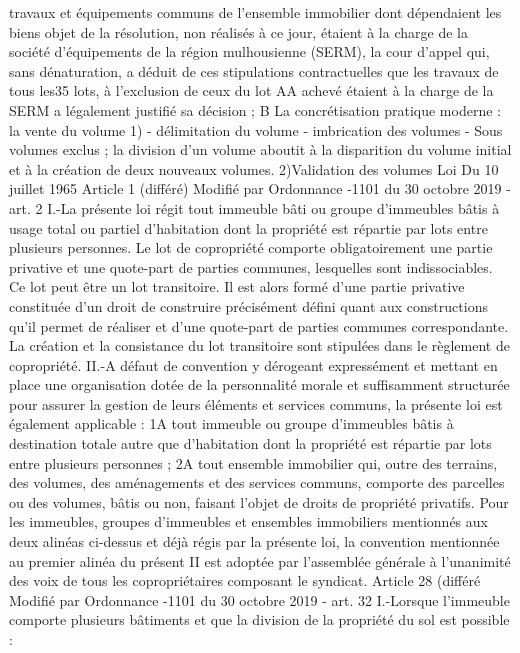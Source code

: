 \documentclass[11pt,a4paper]{report}
\begin{document}
	travaux et équipements communs de l'ensemble immobilier dont dépendaient les biens
	objet de la résolution, non réalisés à ce jour, étaient à la charge de la société
	d'équipements de la région mulhousienne (SERM), la cour d'appel qui, sans
	dénaturation, a déduit de ces stipulations contractuelles que les travaux de tous les35
	lots, à l'exclusion de ceux du lot AA achevé étaient à la charge de la SERM a
	légalement justifié sa décision ;
	B La concrétisation pratique moderne : la vente du volume
	1) - délimitation du volume
	- imbrication des volumes
	- Sous volumes exclus ; la division d’un volume aboutit à la disparition du volume initial et à la création de deux
	nouveaux volumes.
	2)Validation des volumes
	Loi Du 10 juillet 1965 Article 1 (différé) Modifié par Ordonnance -1101 du 30 octobre 2019 - art. 2
	I.-La présente loi régit tout immeuble bâti ou groupe d'immeubles bâtis à usage total ou partiel d'habitation dont
	la propriété est répartie par lots entre plusieurs personnes.
	Le lot de copropriété comporte obligatoirement une partie privative et une quote-part de parties communes,
	lesquelles sont indissociables.
	Ce lot peut être un lot transitoire. Il est alors formé d'une partie privative constituée d'un droit de construire
	précisément défini quant aux constructions qu'il permet de réaliser et d'une quote-part de parties communes
	correspondante.
	La création et la consistance du lot transitoire sont stipulées dans le règlement de copropriété.
	II.-A défaut de convention y dérogeant expressément et mettant en place une organisation dotée de la
	personnalité morale et suffisamment structurée pour assurer la gestion de leurs éléments et services communs,
	la présente loi est également applicable :
	1\degre  A tout immeuble ou groupe d'immeubles bâtis à destination totale autre que d'habitation dont la propriété est
	répartie par lots entre plusieurs personnes ;
	2\degre  A tout ensemble immobilier qui, outre des terrains, des volumes, des aménagements et des services communs,
	comporte des parcelles ou des volumes, bâtis ou non, faisant l'objet de droits de propriété privatifs.
	Pour les immeubles, groupes d'immeubles et ensembles immobiliers mentionnés aux deux alinéas ci-dessus et
	déjà régis par la présente loi, la convention mentionnée au premier alinéa du présent II est adoptée par
	l'assemblée générale à l'unanimité des voix de tous les copropriétaires composant le syndicat.
	Article 28 (différé Modifié par Ordonnance -1101 du 30 octobre 2019 - art. 32
	I.-Lorsque l'immeuble comporte plusieurs bâtiments et que la division de la propriété du sol est possible :
\end{document}
